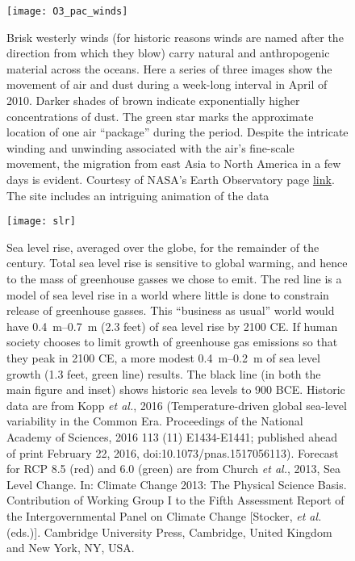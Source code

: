 \documentclass[amstex,12pt]{book}
\begin{document}
\newpage
\begin{figure}[p]
\centering
\texttt{[image: O3\_pac\_winds]}%

\caption{Brisk westerly winds (for historic reasons winds are named after the direction from which they blow) carry natural and anthropogenic material across the oceans. Here a series of three images show the movement of air and dust during a week-long interval in April of 2010. Darker shades of brown indicate exponentially higher concentrations of dust. The green star marks the approximate location of one air ``package'' during the period. Despite the intricate winding and unwinding associated with the air's fine-scale movement, the migration from east Asia to North America in a few days is evident. Courtesy of NASA's Earth Observatory page \href{http://earthobservatory.nasa.gov/IOTD/view.php?id=78742}{link}. The site includes an intriguing animation of the data}

\label{fig:O3_pac_winds}
\end{figure}

\newpage
\begin{figure}[p]
\centering
\texttt{[image: slr]}%

\caption{Sea level rise, averaged over the globe, for the remainder of the century. Total sea level rise is sensitive to global warming, and hence to the mass of greenhouse gasses we chose to emit. The red line is a model of sea level rise in a world where little is done to constrain release of greenhouse gasses. This ``business as usual'' world would have \SIrange{0.4}{0.7}{\metre} (2.3 feet) of sea level rise by 2100 CE. If human society chooses to limit growth of greenhouse gas emissions so that they peak in 2100 CE, a more modest \SIrange{0.4}{0.2}{\metre} of sea level growth (1.3 feet, green line) results. The black line (in both the main figure and inset) shows historic sea levels to 900 BCE. Historic data are from Kopp \textit{et al.}, 2016 (Temperature-driven global sea-level variability in the Common Era. Proceedings of the National Academy of Sciences, 2016 113 (11) E1434-E1441; published ahead of print February 22, 2016, doi:10.1073/pnas.1517056113). Forecast for RCP 8.5 (red) and 6.0 (green) are from Church \textsl{et al.}, 2013, Sea Level Change. In: Climate Change 2013: The Physical Science Basis. Contribution of Working Group I to the Fifth Assessment Report of the Intergovernmental Panel on Climate Change [Stocker, \textit{et al.} (eds.)]. Cambridge University Press, Cambridge, United Kingdom and New York, NY, USA. }

\label{fig:slr}

\end{figure}
\end{document}
